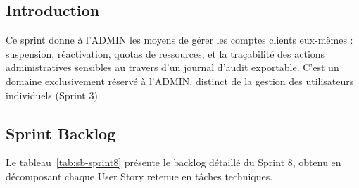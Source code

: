 \subsection{Introduction}

Ce sprint donne à l'ADMIN les moyens de gérer les comptes clients eux-mêmes : suspension, réactivation, quotas de ressources, et la traçabilité des actions administratives sensibles au travers d'un journal d'audit exportable. C'est un domaine exclusivement réservé à l'ADMIN, distinct de la gestion des utilisateurs individuels (Sprint 3).
\subsection{Sprint Backlog}
Le tableau~\ref{tab:sb-sprint8} présente le backlog détaillé du Sprint 8, obtenu en décomposant chaque User Story retenue en tâches techniques.

